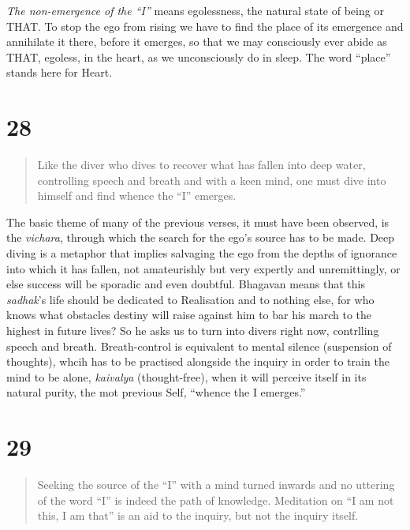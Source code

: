 \documentclass[12pt]{report}
\begin{document}
\index{}

\emph{The non-emergence of the ``I''} means egolessness, the natural
state of being or THAT. To stop the ego from rising we have to find
the place of its emergence and annihilate it there, before it
emerges, so that we may consciously ever abide as THAT, egoless, in
the heart, as we unconsciously do in sleep. The word ``place''
stands here for Heart.

\section{28}

\begin{quote}
  Like the diver who dives to recover what has fallen into deep water,
  controlling speech and breath and with a keen mind, one must dive
  into himself and find whence the ``I'' emerges.
\end{quote}

The basic theme of many of the previous verses, it must have been
observed, is the \emph{vichara}, through which the search for the
ego's source has to be made. Deep diving is a metaphor that implies
salvaging the ego from the depths of ignorance into which it has
fallen, not amateurishly but very expertly and unremittingly, or else
success will be sporadic and even doubtful. Bhagavan means that this
\emph{sadhak}'s life should be dedicated to Realisation and to nothing
else, for who knows what obstacles destiny will raise against him to
bar his march to the highest in future lives? So he asks us to turn
into divers right now, contrlling speech and breath. Breath-control is
equivalent to mental silence (suspension of thoughts), whcih has to be
practised alongside the inquiry in order to train the mind to be
alone, \emph{kaivalya} (thought-free), when it will perceive itself in
its natural purity, the mot previous Self, ``whence the I emerges.''

\index{}

\section{29}

\begin{quote}
  Seeking the source of the ``I'' with a mind turned inwards and no
  uttering of the word ``I'' is indeed the path of
  knowledge. Meditation on ``I am not this, I am that'' is an aid to
  the inquiry, but not the inquiry itself.
\end{quote}
\end{document}
